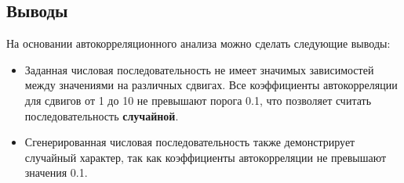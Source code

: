 \subsection{Выводы}

На основании автокорреляционного анализа можно сделать следующие выводы:
\begin{itemize}
	\item Заданная числовая последовательность не имеет значимых зависимостей между значениями на различных сдвигах. Все коэффициенты автокорреляции для сдвигов от 1 до 10 не превышают порога 0.1, что позволяет считать последовательность \textbf{случайной}.
	\item Сгенерированная числовая последовательность также демонстрирует случайный характер, так как коэффициенты автокорреляции не превышают значения 0.1.
\end{itemize}

